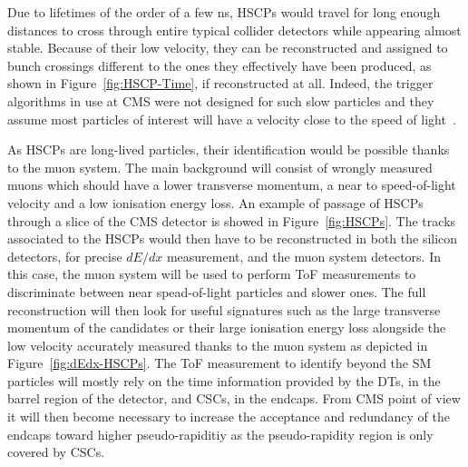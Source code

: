 	Due to lifetimes of the order of a few \si{ns}, HSCPs would travel for long enough distances to cross through entire typical collider detectors while appearing almost stable. Because of their low velocity, they can be reconstructed and assigned to bunch crossings different to the ones they effectively have been produced, as shown in Figure~\ref{fig:HSCP-Time}, if reconstructed at all. Indeed, the trigger algorithms in use at CMS were not designed for such slow particles and they assume most particles of interest will have a velocity close to the speed of light~\cite{KHACHATRYAN2017,KAZANA2009}.
	
	As HSCPs are long-lived particles, their identification would be possible thanks to the muon system. The main background will consist of wrongly measured muons which should have a lower transverse momentum, a near to speed-of-light velocity and a low ionisation energy loss. An example of passage of HSCPs through a slice of the CMS detector is showed in Figure~\ref{fig:HSCPs}. The tracks associated to the HSCPs would then have to be reconstructed in both the silicon detectors, for precise $dE/dx$ measurement, and the muon system detectors. In this case, the muon system will be used to perform \acf{ToF} measurements to discriminate between near spead-of-light particles and slower ones. The full reconstruction will then look for useful signatures such as the large transverse momentum of the candidates or their large ionisation energy loss alongside the low velocity accurately measured thanks to the muon system as depicted in Figure~\ref{fig:dEdx-HSCPs}. The ToF measurement to identify beyond the \acl{SM} particles will mostly rely on the time information provided by the \acl{DT}s, in the barrel region of the detector, and \acl{CSC}s, in the endcaps. From CMS point of view it will then become necessary to increase the acceptance and redundancy of the endcaps toward higher pseudo-rapiditiy as the pseudo-rapidity region  is only covered by CSCs.\\
	
\endgroup

